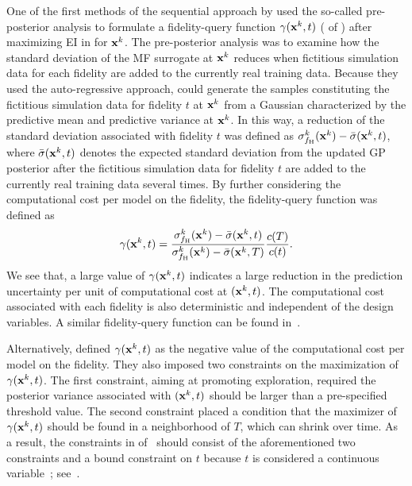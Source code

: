 \documentclass[journal ]{new-aiaa}
\begin{document}
	One of the first methods of the sequential approach by \citet{Chen2016} used the so-called pre-posterior analysis to formulate a fidelity-query function $\gamma({\bf x}^k,t)$ ( of ) after maximizing EI in  for ${\bf x}^k$.
	The pre-posterior analysis was to examine how the standard deviation of the MF surrogate at ${\bf x}^k$ reduces when fictitious simulation data for each fidelity are added to the currently real training data.
	Because they used the auto-regressive approach, \citet{Chen2016} could generate the samples constituting the fictitious simulation data for fidelity $t$ at ${\bf x}^k$ from a Gaussian characterized by the predictive mean and predictive variance at ${\bf x}^k$.
	In this way, a reduction of the standard deviation associated with fidelity $t$ was defined as $\sigma_{f_\text{H}}^k({\bf x}^k)-\bar{\sigma}({\bf x}^k,t)$, where $\bar{\sigma}({\bf x}^k,t)$ denotes the expected standard deviation from the updated GP posterior after the fictitious simulation data for fidelity $t$ are added to the currently real training data several times.
	By further considering the computational cost per model on the fidelity, the fidelity-query function was defined as
	\begin{equation}\label{eqn57}
		\gamma({\bf x}^k,t) = \frac{\sigma_{f_\text{H}}^k({\bf x}^k)-\bar{\sigma}({\bf x}^k,t)}{\sigma_{f_\text{H}}^k({\bf x}^k)-\bar{\sigma}({\bf x}^k,T)} \frac{c(T)}{c(t)}.
	\end{equation}
	We see that, a large value of $\gamma({\bf x}^k,t)$ indicates a large reduction in the prediction uncertainty per unit of computational cost at $({\bf x}^k,t)$.
	The computational cost associated with each fidelity is also deterministic and independent of the design variables. 
	A similar fidelity-query function can be found in~\citet{Tran2020jcp,Tran2020cise}.
	
	Alternatively, \citet{Kandasamy2017} defined $\gamma({\bf x}^k,t)$ as the negative value of the computational cost per model on the fidelity.
	They also imposed two constraints on the maximization of $\gamma({\bf x}^k,t)$.
	The first constraint, aiming at promoting exploration, required the posterior variance associated with $({\bf x}^k,t)$ should be larger than a pre-specified threshold value.
	The second constraint placed a condition that the maximizer of $\gamma({\bf x}^k,t)$ should be found in a neighborhood of $T$, which can shrink over time.
	As a result, the constraints in  of~ should consist of the aforementioned two constraints and a bound constraint on $t$ because $t$ is considered a continuous variable~\citep{Kandasamy2017}; see~.
	
\end{document}
